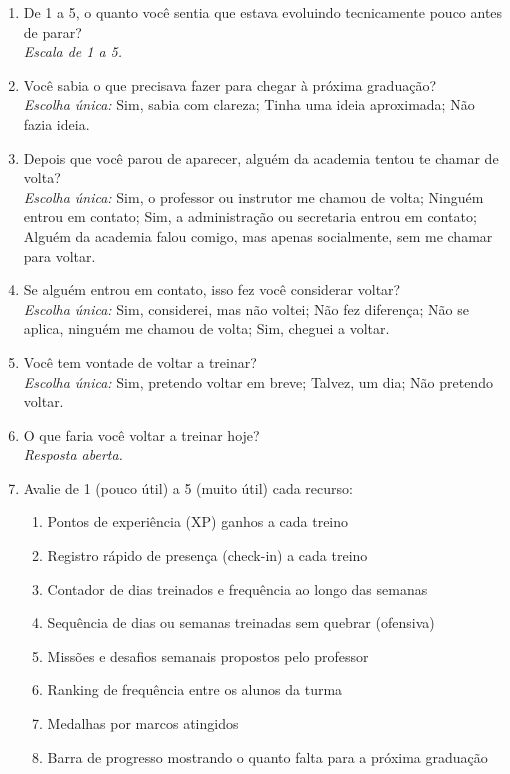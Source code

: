 \begin{enumerate}[leftmargin=*, itemsep=1pt, parsep=0pt]
  \item De 1 a 5, o quanto você sentia que estava evoluindo tecnicamente pouco antes de parar?\\
        {\footnotesize\textit{Escala de 1 a 5.}}
  \item Você sabia o que precisava fazer para chegar à próxima graduação?\\
        {\footnotesize\textit{Escolha única:} Sim, sabia com clareza; Tinha uma ideia aproximada; Não fazia ideia.}
  \item Depois que você parou de aparecer, alguém da academia tentou te chamar de volta?\\
        {\footnotesize\textit{Escolha única:} Sim, o professor ou instrutor me chamou de volta; Ninguém entrou em contato; Sim, a administração ou secretaria entrou em contato; Alguém da academia falou comigo, mas apenas socialmente, sem me chamar para voltar.}
  \item Se alguém entrou em contato, isso fez você considerar voltar?\\
        {\footnotesize\textit{Escolha única:} Sim, considerei, mas não voltei; Não fez diferença; Não se aplica, ninguém me chamou de volta; Sim, cheguei a voltar.}
  \item Você tem vontade de voltar a treinar?\\
        {\footnotesize\textit{Escolha única:} Sim, pretendo voltar em breve; Talvez, um dia; Não pretendo voltar.}
  \item O que faria você voltar a treinar hoje?\\
        {\footnotesize\textit{Resposta aberta.}}
  \item Avalie de 1 (pouco útil) a 5 (muito útil) cada recurso:
  \begin{enumerate}[label=\alph*)]
    \item Pontos de experiência (XP) ganhos a cada treino
    \item Registro rápido de presença (check-in) a cada treino
    \item Contador de dias treinados e frequência ao longo das semanas
    \item Sequência de dias ou semanas treinadas sem quebrar (ofensiva)
    \item Missões e desafios semanais propostos pelo professor
    \item Ranking de frequência entre os alunos da turma
    \item Medalhas por marcos atingidos
    \item Barra de progresso mostrando o quanto falta para a próxima graduação

\end{enumerate}
\end{enumerate}
